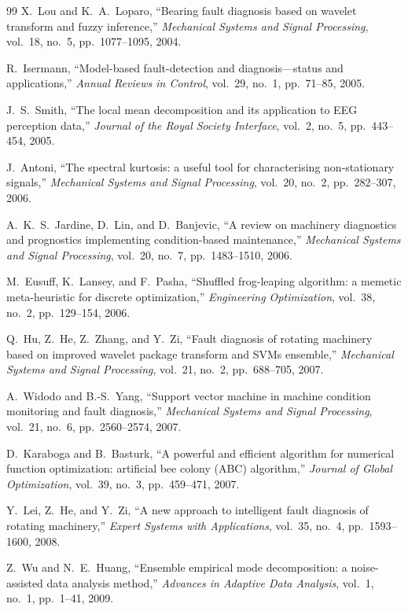 \begin{thebibliography}{99}
X.~Lou and K.~A.~Loparo,
``Bearing fault diagnosis based on wavelet transform and fuzzy inference,''
\textit{Mechanical Systems and Signal Processing}, vol.~18, no.~5, pp.~1077--1095, 2004.

R.~Isermann,
``Model-based fault-detection and diagnosis---status and applications,''
\textit{Annual Reviews in Control}, vol.~29, no.~1, pp.~71--85, 2005.

J.~S.~Smith,
``The local mean decomposition and its application to EEG perception data,''
\textit{Journal of the Royal Society Interface}, vol.~2, no.~5, pp.~443--454, 2005.

J.~Antoni,
``The spectral kurtosis: a useful tool for characterising non-stationary signals,''
\textit{Mechanical Systems and Signal Processing}, vol.~20, no.~2, pp.~282--307, 2006.

A.~K.~S.~Jardine, D.~Lin, and D.~Banjevic,
``A review on machinery diagnostics and prognostics implementing condition-based maintenance,''
\textit{Mechanical Systems and Signal Processing}, vol.~20, no.~7, pp.~1483--1510, 2006.

M.~Eusuff, K.~Lansey, and F.~Pasha,
``Shuffled frog-leaping algorithm: a memetic meta-heuristic for discrete optimization,''
\textit{Engineering Optimization}, vol.~38, no.~2, pp.~129--154, 2006.

Q.~Hu, Z.~He, Z.~Zhang, and Y.~Zi,
``Fault diagnosis of rotating machinery based on improved wavelet package transform and SVMs ensemble,''
\textit{Mechanical Systems and Signal Processing}, vol.~21, no.~2, pp.~688--705, 2007.

A.~Widodo and B.-S.~Yang,
``Support vector machine in machine condition monitoring and fault diagnosis,''
\textit{Mechanical Systems and Signal Processing}, vol.~21, no.~6, pp.~2560--2574, 2007.

D.~Karaboga and B.~Basturk,
``A powerful and efficient algorithm for numerical function optimization: artificial bee colony (ABC) algorithm,''
\textit{Journal of Global Optimization}, vol.~39, no.~3, pp.~459--471, 2007.

Y.~Lei, Z.~He, and Y.~Zi,
``A new approach to intelligent fault diagnosis of rotating machinery,''
\textit{Expert Systems with Applications}, vol.~35, no.~4, pp.~1593--1600, 2008.

Z.~Wu and N.~E.~Huang,
``Ensemble empirical mode decomposition: a noise-assisted data analysis method,''
\textit{Advances in Adaptive Data Analysis}, vol.~1, no.~1, pp.~1--41, 2009.


\end{thebibliography}
